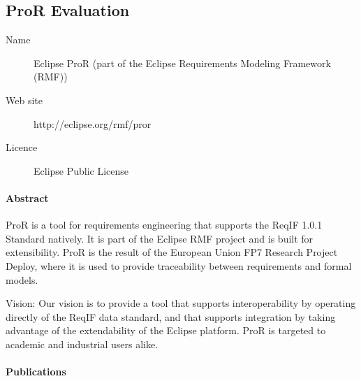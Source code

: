 \subsection{ProR Evaluation}

\begin{description}
\item[Name] Eclipse ProR (part of the Eclipse Requirements Modeling Framework (RMF))
\item[Web site] http://eclipse.org/rmf/pror
\item[Licence] Eclipse Public License
\end{description} 

\paragraph{Abstract}

ProR is a tool for requirements engineering that supports the ReqIF 1.0.1 Standard natively. It is part of the Eclipse RMF project and is built for extensibility. ProR is the result of the European Union FP7 Research Project Deploy, where it is used to provide traceability between requirements and formal models.

Vision: Our vision is to provide a tool that supports interoperability by operating directly of the ReqIF data standard, and that supports integration by taking advantage of the extendability of the Eclipse platform. ProR is targeted to academic and industrial users alike. 

\paragraph{Publications}

